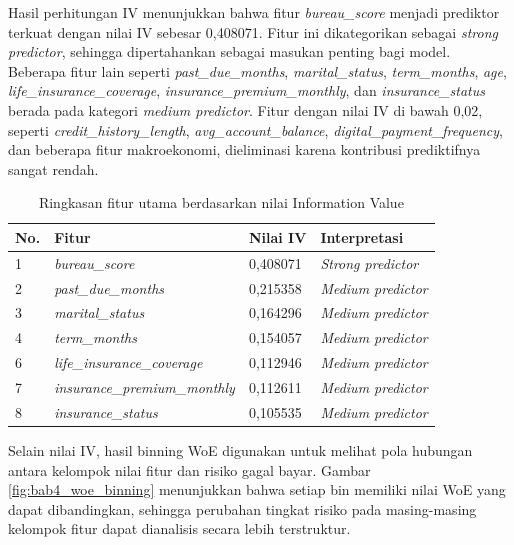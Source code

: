 Hasil perhitungan IV menunjukkan bahwa fitur \textit{bureau\_score} menjadi prediktor terkuat dengan nilai IV sebesar 0,408071. Fitur ini dikategorikan sebagai \textit{strong predictor}, sehingga dipertahankan sebagai masukan penting bagi model. Beberapa fitur lain seperti \textit{past\_due\_months}, \textit{marital\_status}, \textit{term\_months}, \textit{age}, \textit{life\_insurance\_coverage}, \textit{insurance\_premium\_monthly}, dan \textit{insurance\_status} berada pada kategori \textit{medium predictor}. Fitur dengan nilai IV di bawah 0,02, seperti \textit{credit\_history\_length}, \textit{avg\_account\_balance}, \textit{digital\_payment\_frequency}, dan beberapa fitur makroekonomi, dieliminasi karena kontribusi prediktifnya sangat rendah.

\begin{table}[H]
\centering
\caption{Ringkasan fitur utama berdasarkan nilai Information Value}
\label{tab:bab4_iv_summary}
\begin{tabular}{|p{}|p{}|p{}|p{}|}
\hline
\textbf{No.} & \textbf{Fitur} & \textbf{Nilai IV} & \textbf{Interpretasi} \\
\hline
1 & \textit{bureau\_score} & 0,408071 & \textit{Strong predictor} \\
\hline
2 & \textit{past\_due\_months} & 0,215358 & \textit{Medium predictor} \\
\hline
3 & \textit{marital\_status} & 0,164296 & \textit{Medium predictor} \\
\hline
4 & \textit{term\_months} & 0,154057 & \textit{Medium predictor} \\
\hline
6 & \textit{life\_insurance\_coverage} & 0,112946 & \textit{Medium predictor} \\
\hline
7 & \textit{insurance\_premium\_monthly} & 0,112611 & \textit{Medium predictor} \\
\hline
8 & \textit{insurance\_status} & 0,105535 & \textit{Medium predictor} \\
\hline
\end{tabular}
\end{table}




Selain nilai IV, hasil binning WoE digunakan untuk melihat pola hubungan antara kelompok nilai fitur dan risiko gagal bayar. Gambar \ref{fig:bab4_woe_binning} menunjukkan bahwa setiap bin memiliki nilai WoE yang dapat dibandingkan, sehingga perubahan tingkat risiko pada masing-masing kelompok fitur dapat dianalisis secara lebih terstruktur.


